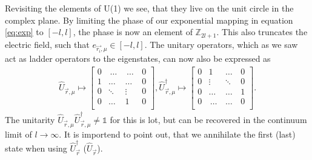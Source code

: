Revisiting the elements of U(1) we see, that they live on the unit circle in the complex plane. By limiting the phase of our exponential mapping in equation \ref{eq:exp} to $[-l, l]$, the phase is now an element of $\mathbb{Z}_{2l+1}$. This also truncates the electric field, such that $e_{\vec{r_i}, \mu}\in[-l, l]$. The unitary operators, which as we saw act as ladder operators to the eigenstates, can now also be expressed as
\begin{align*}
	\hat{U}_{\vec{r}, \mu} \mapsto \begin{bmatrix}
		                               0 & \,\dots\, & \,\dots \, & 0 \\
		                               1 & \dots     & \dots      & 0 \\
		                               0 & \ddots    & \vdots     & 0 \\
		                               0 & \dots     & 1          & 0 \\
	                               \end{bmatrix}, \hat{U}_{\vec{r}, \mu}^{\dag} \mapsto \begin{bmatrix}
		                                                                                    0 & 1          & \dots    & 0 \\
		                                                                                    0 & \vdots     & \ddots   & 0 \\
		                                                                                    0 & \dots      & \dots    & 1 \\
		                                                                                    0 & \,\dots \, & \dots \, & 0 \\
	                                                                                    \end{bmatrix}.
\end{align*}
The unitarity $\hat{U}_{\vec{r}, \mu}\hat{U}_{\vec{r}, \mu}^\dag\neq\mathds{1}$ for this is lot, but can be recovered in the continuum limit of $l\rightarrow\infty$. It is importend to point out, that we annihilate the first (last) state when using $\hat{U}_{\vec{r}}^{\dag}$ ($\hat{U}_{\vec{r}}$).
